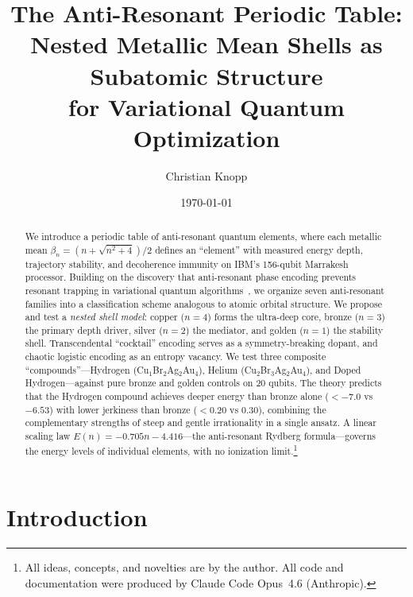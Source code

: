 \documentclass[twocolumn,showpacs,preprintnumbers,amsmath,amssymb,aps,prl]{revtex4-2}
\begin{document}

\title{The Anti-Resonant Periodic Table:\\Nested Metallic Mean Shells as Subatomic Structure\\for Variational Quantum Optimization}

\author{Christian Knopp}

\date{\today}

\begin{abstract}
We introduce a periodic table of anti-resonant quantum elements, where each metallic mean $\beta_n = (n + \sqrt{n^2+4})/2$ defines an ``element'' with measured energy depth, trajectory stability, and decoherence immunity on IBM's 156-qubit Marrakesh processor. Building on the discovery that anti-resonant phase encoding prevents resonant trapping in variational quantum algorithms~\cite{knopp2026qgp}, we organize seven anti-resonant families into a classification scheme analogous to atomic orbital structure. We propose and test a \emph{nested shell model}: copper ($n\!=\!4$) forms the ultra-deep core, bronze ($n\!=\!3$) the primary depth driver, silver ($n\!=\!2$) the mediator, and golden ($n\!=\!1$) the stability shell. Transcendental ``cocktail'' encoding serves as a symmetry-breaking dopant, and chaotic logistic encoding as an entropy vacancy. We test three composite ``compounds''---Hydrogen (Cu$_1$Br$_2$Ag$_2$Au$_4$), Helium (Cu$_2$Br$_3$Ag$_2$Au$_4$), and Doped Hydrogen---against pure bronze and golden controls on 20 qubits. The theory predicts that the Hydrogen compound achieves deeper energy than bronze alone ($<-7.0$ vs $-6.53$) with lower jerkiness than bronze ($<0.20$ vs $0.30$), combining the complementary strengths of steep and gentle irrationality in a single ansatz. A linear scaling law $E(n) = -0.705n - 4.416$---the anti-resonant Rydberg formula---governs the energy levels of individual elements, with no ionization limit.\footnote{All ideas, concepts, and novelties are by the author. All code and documentation were produced by Claude Code Opus~4.6 (Anthropic).}
\end{abstract}

\maketitle

\section{Introduction}
\label{sec:intro}
\end{document}
